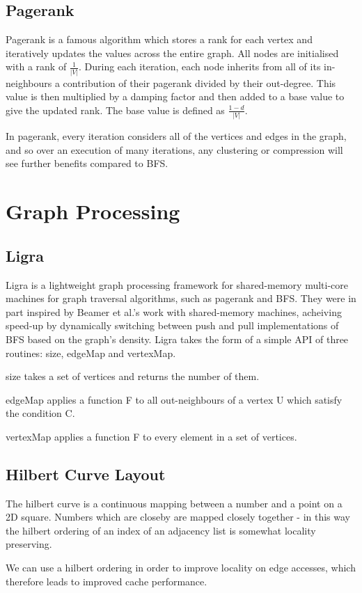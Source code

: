 \subsection{Pagerank}

Pagerank is a famous algorithm which stores a rank for each vertex and iteratively updates the values
across the entire graph. All nodes are initialised with a rank of $\frac{1}{|V|}$. During each
iteration, each node inherits from all of its in-neighbours a contribution of their pagerank divided
by their out-degree. This value is then multiplied by a damping factor and then added to a base value
to give the updated rank. The base value is defined as $\frac{1 - d}{|V|}$.

In pagerank, every iteration considers all of the vertices and edges in the graph, and so over
an execution of many iterations, any clustering or compression will see further benefits compared to
BFS.

\section{Graph Processing}

\subsection{Ligra}

Ligra is a lightweight graph processing framework for shared-memory multi-core machines for graph
traversal algorithms, such as pagerank and BFS. They were in part inspired by Beamer et al.'s work
with shared-memory machines, acheiving speed-up by dynamically switching between push and pull implementations of BFS based on the graph's density. Ligra takes the form of a simple API of three
routines: size, edgeMap and vertexMap.

size takes a set of vertices and returns the number of them.

edgeMap applies a function F to all out-neighbours of a vertex U which satisfy the condition C.

vertexMap applies a function F to every element in a set of vertices.

\subsection{Hilbert Curve Layout}

The hilbert curve is a continuous mapping between a number and a point on a 2D square. Numbers which
are closeby are mapped closely together - in this way the hilbert ordering of an index of an adjacency
list is somewhat locality preserving.

We can use a hilbert ordering in order to improve locality on edge accesses, which therefore leads to
improved cache performance.

